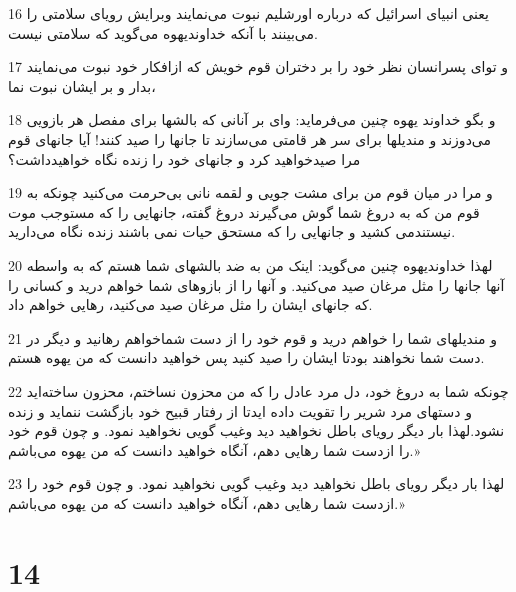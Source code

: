 \par 16 یعنی انبیای اسرائیل که درباره اورشلیم نبوت می‌نمایند وبرایش رویای سلامتی را می‌بینند با آنکه خداوندیهوه می‌گوید که سلامتی نیست.
\par 17 و تو‌ای پسرانسان نظر خود را بر دختران قوم خویش که ازافکار خود نبوت می‌نمایند بدار و بر ایشان نبوت نما،
\par 18 و بگو خداوند یهوه چنین می‌فرماید: وای بر آنانی که بالشها برای مفصل هر بازویی می‌دوزند و مندیلها برای سر هر قامتی می‌سازند تا جانها را صید کنند! آیا جانهای قوم مرا صیدخواهید کرد و جانهای خود را زنده نگاه خواهیدداشت؟
\par 19 و مرا در میان قوم من برای مشت جویی و لقمه نانی بی‌حرمت می‌کنید چونکه به قوم من که به دروغ شما گوش می‌گیرند دروغ گفته، جانهایی را که مستوجب موت نیستندمی کشید و جانهایی را که مستحق حیات نمی باشند زنده نگاه می‌دارید.
\par 20 لهذا خداوندیهوه چنین می‌گوید: اینک من به ضد بالشهای شما هستم که به واسطه آنها جانها را مثل مرغان صید می‌کنید. و آنها را از بازوهای شما خواهم درید و کسانی را که جانهای ایشان را مثل مرغان صید می‌کنید، رهایی خواهم داد.
\par 21 و مندیلهای شما را خواهم درید و قوم خود را از دست شماخواهم رهانید و دیگر در دست شما نخواهند بودتا ایشان را صید کنید پس خواهید دانست که من یهوه هستم.
\par 22 چونکه شما به دروغ خود، دل مرد عادل را که من محزون نساختم، محزون ساخته‌اید و دستهای مرد شریر را تقویت داده ایدتا از رفتار قبیح خود بازگشت ننماید و زنده نشود.لهذا بار دیگر رویای باطل نخواهید دید وغیب گویی نخواهید نمود. و چون قوم خود را ازدست شما رهایی دهم، آنگاه خواهید دانست که من یهوه می‌باشم.»
\par 23 لهذا بار دیگر رویای باطل نخواهید دید وغیب گویی نخواهید نمود. و چون قوم خود را ازدست شما رهایی دهم، آنگاه خواهید دانست که من یهوه می‌باشم.»

\chapter{14}


